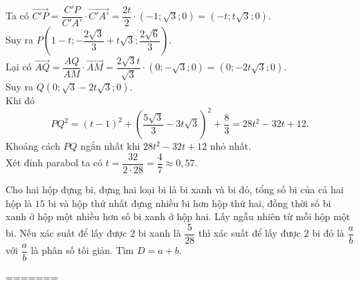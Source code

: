 \begin{ex}
{{\begin{tikzpicture}[scale=0.8,>=stealth, line join=round, line cap=round, font=\footnotesize]
\end{tikzpicture}		
		}\noindent
Ta có $\overrightarrow{C'P}=\dfrac{C'P}{C'A'}\cdot\overrightarrow{C'A'}=\dfrac{2t}{2}\cdot \left(-1;\sqrt{3};0\right)=\left(-t;t\sqrt{3};0\right)$.\\
Suy ra $P\left(1-t;-\dfrac{2\sqrt{3}}{3}+t\sqrt{3};\dfrac{2\sqrt{6}}{3}\right)$.\\
		Lại có $\overrightarrow{AQ}=\dfrac{AQ}{AM}\cdot \overrightarrow{AM} = \dfrac{2\sqrt{3}t}{\sqrt{3}}\cdot \left(0;-\sqrt{3};0\right) = \left(0;-2t\sqrt{3};0\right)$.\\
		Suy ra $Q\left(0;\sqrt{3}-2t\sqrt{3};0\right)$.\\
		Khi đó
		$$
			PQ^2 = (t-1)^2 + \left(\dfrac{5\sqrt{3}}{3}-3t\sqrt{3}\right)^2 + \dfrac{8}{3}
			= 28t^2-32t+12.
		$$
		Khoảng cách $PQ$ ngắn nhất khi $28t^2-32t+12$ nhỏ nhất.\\ Xét đỉnh parabol ta có $t=\dfrac{32}{2\cdot 28} = \dfrac{4}{7} \approx 0{,}57$.
	}
\end{ex}

\begin{ex}%
Cho hai hộp đựng bi, đựng hai loại bi là bi xanh và bi đỏ, tổng số bi của cả hai hộp là $15$ bi và hộp thứ nhất đựng nhiều bi hơn hộp thứ hai, đồng thời số bi xanh ở hộp một nhiều hơn số bi xanh ở hộp hai. Lấy ngẫu nhiên từ mỗi hộp một bi. Nếu xác suất để lấy được $2$ bi xanh là $\dfrac{5}{28}$ thì xác suất để lấy được $2$ bi đỏ là $\dfrac{a}{b}$ với $\dfrac{a}{b}$ là phân số tối giản. Tìm $D=a+b$.
	\par{}
\end{ex}

=======

